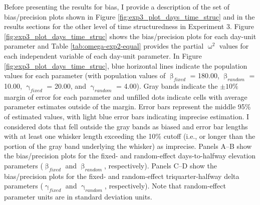 \documentclass[
12pt, %
twoside,
english]{guelphthesis}
\begin{document}
Before presenting the results for bias, I provide a description of the set of bias/precision plots shown in Figure \ref{fig:exp3_plot_days_time_struc} and in the results sections for the other level of time structuredness in Experiment 3. Figure \ref{fig:exp3_plot_days_time_struc} shows the bias/precision plots for each day-unit parameter and Table \ref{tab:omega-exp2-equal} provides the partial \(\upomega^2\) values for each independent variable of each day-unit parameter. In Figure \ref{fig:exp3_plot_days_time_struc}, blue horizontal lines indicate the population values for each parameter (with population values of \(\upbeta_{fixed}\) = 180.00, \(\upbeta_{random}\) = 10.00, \(\upgamma_{fixed}\) = 20.00, and \(\upgamma_{random}\) = 4.00). Gray bands indicate the \(\pm 10\%\) margin of error for each parameter and unfilled dots indicate cells with average parameter estimates outside of the margin. Error bars represent the middle 95\% of estimated values, with light blue error bars indicating imprecise estimation. I considered dots that fell outside the gray bands as biased and error bar lengths with at least one whisker length exceeding the 10\% cutoff (i.e., or longer than the portion of the gray band underlying the whisker) as imprecise. Panels A--B show the bias/precision plots for the fixed- and random-effect days-to-halfway elevation parameters (\(\upbeta_{fixed}\) and \(\upbeta_{random}\), respectively). Panels C--D show the bias/precision plots for the fixed- and random-effect triquarter-halfway delta parameters (\(\upgamma_{fixed}\) and \(\upgamma_{random}\), respectively). Note that random-effect parameter units are in standard deviation units.
\end{document}
